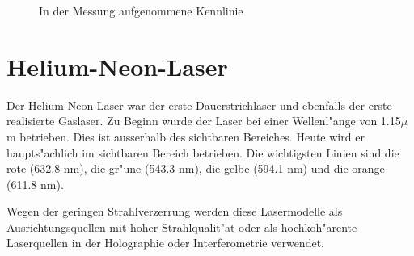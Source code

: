 \begin{refsection}
\begin{figure}
\centering
{}\hfill
{}
\caption{In der Messung aufgenommene Kennlinie}
\label{fig:kennlinie}
\end{figure}



\section{Helium-Neon-Laser}
\label{He-Ne-Laser}

Der Helium-Neon-Laser war der erste Dauerstrichlaser und ebenfalls der erste 
realisierte Gaslaser. Zu Beginn wurde der Laser bei einer Wellenl"ange von 
1.15$\mu$m betrieben. Dies ist ausserhalb des sichtbaren Bereiches. Heute wird 
er haupts"achlich im sichtbaren Bereich betrieben. Die wichtigsten Linien sind 
die rote (632.8 nm), die gr"une (543.3 nm), die gelbe (594.1 nm) und die 
orange (611.8 nm).

Wegen der geringen Strahlverzerrung werden diese Lasermodelle als 
Ausrichtungsquellen mit hoher Strahlqualit"at oder als hochkoh"arente 
Laserquellen in der Holographie oder Interferometrie verwendet.


\end{refsection}

